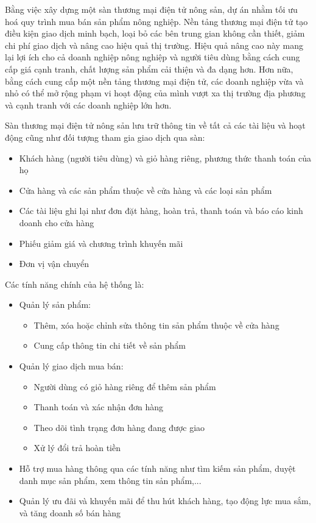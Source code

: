 Bằng việc xây dựng một sàn thương mại điện tử nông sản, dự án nhằm tối ưu hoá quy trình mua bán sản phẩm nông nghiệp. Nền tảng thương mại điện tử tạo điều kiện giao dịch minh bạch, loại bỏ các bên trung gian không cần thiết, giảm chi phí giao dịch và nâng cao hiệu quả thị trường. Hiệu quả nâng cao này mang lại lợi ích cho cả doanh nghiệp nông nghiệp và người tiêu dùng bằng cách cung cấp giá cạnh tranh, chất lượng sản phẩm cải thiện và đa dạng hơn. Hơn nữa, bằng cách cung cấp một nền tảng thương mại điện tử, các doanh nghiệp vừa và nhỏ có thể mở rộng phạm vi hoạt động của mình vượt xa thị trường địa phương và cạnh tranh với các doanh nghiệp lớn hơn. 

Sàn thương mại điện tử nông sản lưu trữ thông tin về tất cả các tài liệu và hoạt động cũng như đối tượng tham gia giao dịch qua sàn:

\begin{itemize}
    \item Khách hàng (người tiêu dùng) và giỏ hàng riêng, phương thức thanh toán của họ 
    \item Cửa hàng và các sản phẩm thuộc về cửa hàng và các loại sản phẩm
    \item Các tài liệu ghi lại như đơn đặt hàng, hoàn trả, thanh toán và báo cáo kinh doanh cho cửa hàng
    \item Phiếu giảm giá và chương trình khuyến mãi
    \item Đơn vị vận chuyển
\end{itemize}

Các tính năng chính của hệ thống là:
\begin{itemize}
    \item Quản lý sản phẩm: 
        \begin{itemize}
            \item Thêm, xóa hoặc chỉnh sửa thông tin sản phẩm thuộc về cửa hàng
            \item Cung cấp thông tin chi tiết về sản phẩm
        \end{itemize}
    \item Quản lý giao dịch mua bán:
        \begin{itemize}
            \item Người dùng có giỏ hàng riêng để thêm sản phẩm
            \item Thanh toán và xác nhận đơn hàng
            \item Theo dõi tình trạng đơn hàng đang được giao
            \item Xử lý đổi trả hoàn tiền
        \end{itemize}
    \item Hỗ trợ mua hàng thông qua các tính năng như tìm kiếm sản phẩm, duyệt danh mục sản phẩm, xem thông tin sản phẩm,...
    \item Quản lý ưu đãi và khuyến mãi để thu hút khách hàng, tạo động lực mua sắm, và tăng doanh số bán hàng
\end{itemize}

